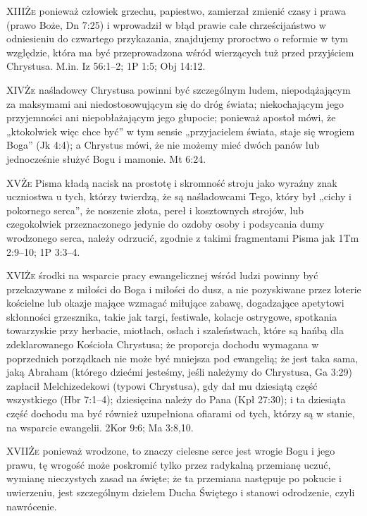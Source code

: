 \lettrine{XIII}{Że} ponieważ człowiek grzechu, papiestwo, zamierzał zmienić czasy i prawa (prawo Boże, Dn 7:25) i wprowadził w błąd prawie całe chrześcijaństwo w odniesieniu do czwartego przykazania, znajdujemy proroctwo o reformie w tym względzie, która ma być przeprowadzona wśród wierzących tuż przed przyjściem Chrystusa. M.in. Iz 56:1--2; 1P 1:5; Obj 14:12.

\lettrine{XIV}{Że} naśladowcy Chrystusa powinni być szczególnym ludem, niepodążającym za maksymami ani niedostosowującym się do dróg świata; niekochającym jego przyjemności ani niepobłażającym jego głupocie; ponieważ apostoł mówi, że „ktokolwiek więc chce być” w tym sensie „przyjacielem świata, staje się wrogiem Boga” (Jk 4:4); a Chrystus mówi, że nie możemy mieć dwóch panów lub jednocześnie służyć Bogu i mamonie. Mt 6:24.

\lettrine{XV}{Że} Pisma kładą nacisk na prostotę i skromność stroju jako wyraźny znak uczniostwa u tych, którzy twierdzą, że są naśladowcami Tego, który był „cichy i pokornego serca”, że noszenie złota, pereł i kosztownych strojów, lub czegokolwiek przeznaczonego jedynie do ozdoby osoby i podsycania dumy wrodzonego serca, należy odrzucić, zgodnie z takimi fragmentami Pisma jak 1Tm 2:9--10; 1P 3:3--4.

\lettrine{XVI}{Że} środki na wsparcie pracy ewangelicznej wśród ludzi powinny być przekazywane z miłości do Boga i miłości do dusz, a nie pozyskiwane przez loterie kościelne lub okazje mające wzmagać miłujące zabawę, dogadzające apetytowi skłonności grzesznika, takie jak targi, festiwale, kolacje ostrygowe, spotkania towarzyskie przy herbacie, miotłach, osłach i szaleństwach, które są hańbą dla zdeklarowanego Kościoła Chrystusa; że proporcja dochodu wymagana w poprzednich porządkach nie może być mniejsza pod ewangelią; że jest taka sama, jaką Abraham (którego dziećmi jesteśmy, jeśli należymy do Chrystusa, Ga 3:29) zapłacił Melchizedekowi (typowi Chrystusa), gdy dał mu dziesiątą część wszystkiego (Hbr 7:1--4); dziesięcina należy do Pana (Kpł 27:30); i ta dziesiąta część dochodu ma być również uzupełniona ofiarami od tych, którzy są w stanie, na wsparcie ewangelii. 2Kor 9:6; Ma 3:8,10.

\lettrine{XVII}{Że} ponieważ wrodzone, to znaczy cielesne serce jest wrogie Bogu i jego prawu, tę wrogość może poskromić tylko przez radykalną przemianę uczuć, wymianę nieczystych zasad na święte; że ta przemiana następuje po pokucie i uwierzeniu, jest szczególnym dziełem Ducha Świętego i stanowi odrodzenie, czyli nawrócenie.

